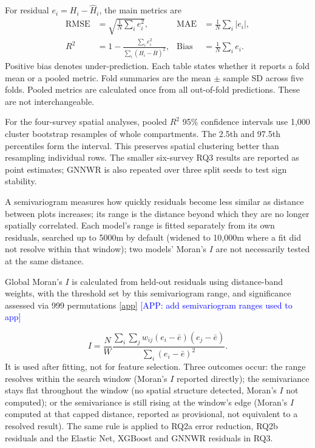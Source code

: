 \documentclass[logo,msc,ai]{infthesis}           %
\newcommand{\app}[1]{\textcolor{blue}{[APP: #1]}}
\begin{document}
For residual $e_i=H_i-\hat H_i$, the main metrics are
\begin{align}
\mathrm{RMSE}&=\sqrt{\frac{1}{N}\sum_i e_i^2}, &
\mathrm{MAE}&=\frac{1}{N}\sum_i|e_i|, \\
R^2&=1-\frac{\sum_i e_i^2}{\sum_i(H_i-\bar H)^2}, &
\mathrm{Bias}&=\frac{1}{N}\sum_i e_i.
\end{align}
Positive bias denotes under-prediction. Each table states whether it reports a fold mean or a
pooled metric. Fold summaries are the mean $\pm$ sample SD across five folds. Pooled metrics are
calculated once from all out-of-fold predictions. These are not interchangeable.

For the four-survey spatial analyses, pooled $R^2$ 95\% confidence intervals use 1,000 cluster bootstrap resamples of whole compartments. The 2.5th and 97.5th percentiles form the interval. This preserves spatial clustering better than resampling individual rows. The smaller six-survey RQ3 results are reported as point estimates; GNNWR is also repeated over three split seeds to test sign stability.

A semivariogram measures how quickly residuals become less similar as distance between plots increases; its range is the distance beyond which they are no longer spatially correlated. Each model's range is fitted separately from its own residuals, searched up to 5000m by default (widened to 10,000m where a fit did not resolve within that window); two models' Moran's $I$ are not necessarily tested at the same distance.

Global Moran's $I$ is calculated from held-out residuals using distance-band weights, with the threshold set by this semivariogram range, and significance assessed via 999 permutations \ref{app} \app{add semivariogram ranges used to app} 

\begin{equation}
I=\frac{N}{W}
\frac{\sum_i\sum_j w_{ij}(e_i-\bar e)(e_j-\bar e)}
{\sum_i(e_i-\bar e)^2}.
\label{eq:morans-i}
\end{equation}
It is used after fitting, not for feature selection. 
Three outcomes occur: the range resolves within the search window (Moran's $I$ reported directly); the semivariance stays flat throughout the window (no spatial structure detected, Moran's $I$ not computed); or the semivariance is still rising at the window's edge (Moran's $I$ computed at that capped distance, reported as provisional, not equivalent to a resolved result). The same rule is applied to RQ2a error reduction, RQ2b residuals and the Elastic Net, XGBoost and GNNWR residuals in RQ3.
\end{document}
